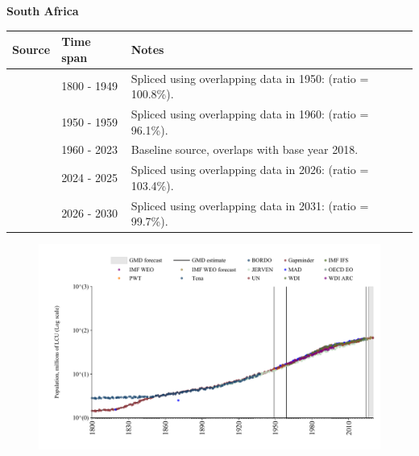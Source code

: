 \documentclass[12pt,a4paper,landscape]{article}
\begin{document}
\begin{adjustbox}{max totalsize={\paperwidth}{\paperheight},center}
\begin{minipage}[t][\textheight][t]{\textwidth}
\vspace*{0.5cm}
{}
\begin{center}
{\Large\bfseries South Africa}
\end{center}
\vspace{0.5cm}
\begin{table}[H]
\centering
\small
\begin{tabular}{|l|l|l|}
\hline
\textbf{Source} & \textbf{Time span} & \textbf{Notes} \\
\hline
\rowcolor{white}\cite{Gapminder}& 1800 - 1949 &Spliced using overlapping data in 1950: (ratio = 100.8\%).\\
\rowcolor{lightgray}\cite{IMF_IFS}& 1950 - 1959 &Spliced using overlapping data in 1960: (ratio = 96.1\%).\\
\rowcolor{white}\cite{WDI}& 1960 - 2023 &Baseline source, overlaps with base year 2018.\\
\rowcolor{lightgray}\cite{OECD_EO}& 2024 - 2025 &Spliced using overlapping data in 2026: (ratio = 103.4\%).\\
\rowcolor{white}\cite{Gapminder}& 2026 - 2030 &Spliced using overlapping data in 2031: (ratio = 99.7\%).\\
\hline
\end{tabular}
\end{table}
\begin{figure}[H]
\centering
\includegraphics[width=\textwidth,height=0.6\textheight,keepaspectratio]{graphs/ZAF_pop.pdf}
\end{figure}
\end{minipage}
\end{adjustbox}
\end{document}
